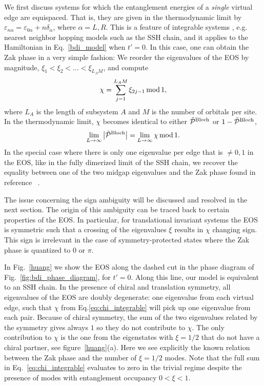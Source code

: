 \documentclass[twocolumn,amsmath,longbibliography,amssymb,superscriptaddress]{revtex4-1}
\newcommand{\carlos}[1]{{\color{red} #1}}
\begin{document}
We first discuss systems for which the entanglement energies of a \emph{single} virtual edge are equispaced. That is, they are given in the thermodynamic limit by $\varepsilon_{n\alpha} = \varepsilon_{0\alpha}+n\delta_\alpha$, where $\alpha = L,R$. 
This is a feature of integrable systems \cite{Peschel1999},  e.g. nearest neighbor hopping models such as the SSH chain, and it applies to the Hamiltonian in Eq.~\eqref{bdi_model} when $t'=0$. 
In this case, one can obtain the Zak phase in a very simple fashion: We reorder the eigenvalues of the EOS by magnitude, $\xi_1 < \xi_2 < ...< \xi_{L_AM}$, and compute
\begin{equation}
\chi = \sum_{j=1}^{L_A M} \xi_{2j-1} \, {\rm mod} \, 1,
\label{eq:chi_integrable}
\end{equation}
where $L_A$ is the length of subsystem $A$ and $M$ is the number of orbitals per site. In the thermodynamic limit, $\chi$ becomes identical to either $\tilde{\mathcal{P}}^{\rm Bloch}$ or $1-\tilde{\mathcal{P}}^{\rm Bloch}$, 
\begin{equation}
\lim_{L \rightarrow \infty} \abs{\tilde{\mathcal{P}}^{\rm Bloch}} = \lim_{L \rightarrow \infty} \chi \, {\rm mod} \, 1.
\end{equation}
In the special case where there is only one eigenvalue per edge that is $\neq 0,1$ in  the EOS, like in the fully dimerized limit of the SSH chain, we recover the equality between one of the two midgap eigenvalues and the Zak phase found in reference ~\cite{Ryu2006}. 

The issue concerning the sign ambiguity will be discussed and resolved in the next section. 
The origin of this ambiguity can be traced back to certain properties of the EOS. 
In particular, for translational invariant systems the EOS is symmetric such that a crossing of the eigenvalues $\xi$ results in $\chi$ changing sign. 
This sign is irrelevant in the case of symmetry-protected states where the Zak phase is quantized to $0$ or $\pi$. 


In Fig.~\ref{huang} we show  the EOS along the dashed cut in the phase diagram of Fig.~\ref{fig:bdi_phase_diagram}, for $t'=0$. 
Along this line, our model is equivalent to an SSH chain. 
In the presence of chiral and translation symmetry, all eigenvalues of the EOS are doubly degenerate: one eigenvalue from each virtual edge, such that $\chi$ from Eq.\eqref{eq:chi_integrable} will pick up one eigenvalue from each pair. Because of chiral symmetry, the sum of the two eigenvalues related by the symmetry gives always $1$ so they do not contribute to $\chi$. The only contribution to $\chi$ is the one from the eigenstates with $\xi=1/2$ that do not have a chiral partner, see figure~\ref{huang}(a). Here we see explicitly the known relation between the Zak phase and the number of $\xi = 1/2$ modes.
Note that the full sum  in Eq.~\eqref{eq:chi_integrable}  evaluates to zero in the trivial regime %
despite the presence of modes with entanglement occupancy $0<\xi<1$. 
\end{document}
